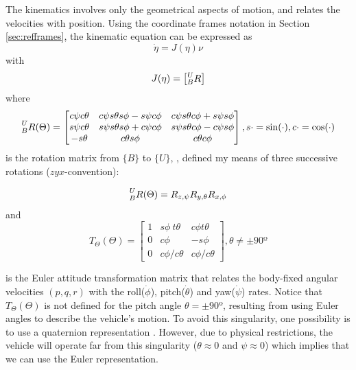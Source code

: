 \par The kinematics involves only the geometrical aspects of motion, and relates the velocities with position. Using the coordinate frames notation in Section \ref{sec:refframes}, the kinematic equation can be expressed as
\begin{equation}
    \dot{\eta} = J(\eta)\nu
\end{equation}
with 
\begin{equation}
    J(\eta) = \begin{bmatrix}
        \prescript{U}{B}{R}
    \end{bmatrix}
\end{equation}
where
\begin{equation}
    \prescript{U}{B}{R(\Theta)} = \begin{bmatrix}
        c\psi c\theta & c\psi s\theta s\phi-s \psi c\phi & c\psi s\theta c\phi+s\psi s\phi \\
        s\psi c\theta & s\psi s\theta s\phi+c\psi c\phi & s\psi s\theta c\phi-c\psi s\phi \\
        -s\theta & c\theta s\phi & c\theta c\phi
    \end{bmatrix}, s\cdot = \sin(\cdot), c\cdot=\cos(\cdot)
\end{equation}
is the rotation matrix from $\{B\}$ to $\{U\}$, \cite{fossen2006nonlinear}, defined my means of three successive rotations ($zyx$-convention):

\begin{equation}
    \prescript{U}{B}{R(\Theta)} = R_{z,\psi}R_{y,\theta}R_{x,\phi}
\end{equation}
and
\begin{equation}
    T_{\Theta}(\Theta) = \begin{bmatrix}
        1 & s\phi\ t\theta & c\phi t\theta \\
        0 & c\phi & -s\phi \\
        0 & c\phi / c\theta & c\phi / c\theta 
    \end{bmatrix}, \theta \neq \pm 90º
\end{equation}

is the Euler attitude transformation matrix that relates the body-fixed angular velocities $(p, q, r)$ with the roll($\dot{\phi}$), pitch($\dot{\theta}$) and yaw($\dot{\psi}$) rates. Notice that $T_\Theta(\Theta)$ is not defined for the pitch angle $\theta = \pm90º$, resulting from using Euler angles to describe the vehicle’s motion. To avoid this singularity, one possibility is to use a quaternion representation \cite{fossen2006nonlinear}. However, due to physical restrictions, the vehicle will operate far from this singularity ($\theta\approx 0$ and $\psi \approx 0$) which implies that we can use the Euler representation.


